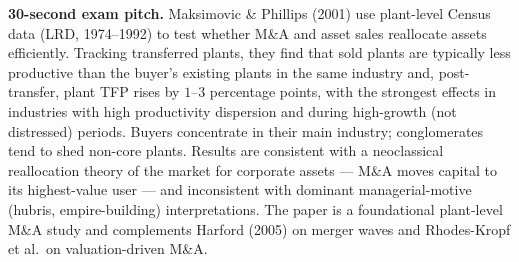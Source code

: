 \documentclass[11pt]{article}
\begin{document}
\begin{keybox}
\textbf{30-second exam pitch.} Maksimovic \& Phillips (2001) use plant-level Census data (LRD, 1974--1992) to test whether M\&A and asset sales reallocate assets efficiently. Tracking transferred plants, they find that sold plants are typically less productive than the buyer's existing plants in the same industry and, post-transfer, plant TFP rises by $1$--$3$ percentage points, with the strongest effects in industries with high productivity dispersion and during high-growth (not distressed) periods. Buyers concentrate in their main industry; conglomerates tend to shed non-core plants. Results are consistent with a neoclassical reallocation theory of the market for corporate assets --- M\&A moves capital to its highest-value user --- and inconsistent with dominant managerial-motive (hubris, empire-building) interpretations. The paper is a foundational plant-level M\&A study and complements Harford (2005) on merger waves and Rhodes-Kropf et al.\ on valuation-driven M\&A.
\end{keybox}
\end{document}
